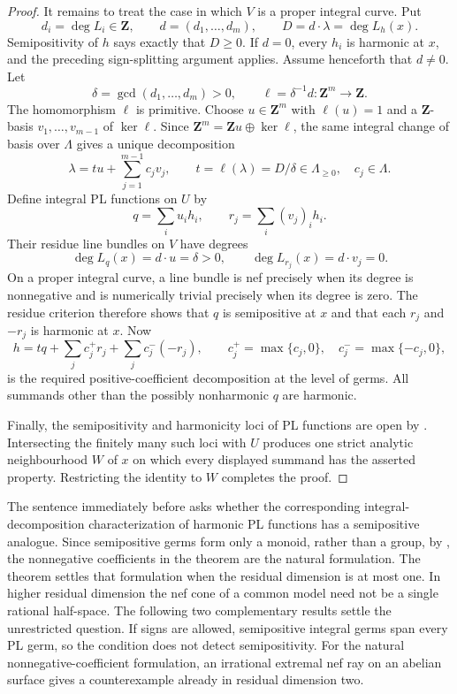 \begin{proof}
It remains to treat the case in which $V$ is a proper integral curve.  Put
\[
                 d_i=\deg L_i\in\mathbf Z,\qquad
                 d=(d_1,\ldots,d_m),\qquad
                 D=d\cdot\lambda=\deg L_h(x).
\]
Semipositivity of $h$ says exactly that $D\geq0$.  If $d=0$, every $h_i$
is harmonic at $x$, and the preceding sign-splitting argument applies.
Assume henceforth that $d\ne0$.  Let
\[
                 \delta=\gcd(d_1,\ldots,d_m)>0,
                 \qquad \ell=\delta^{-1}d:\mathbf Z^m\to\mathbf Z.
\]
The homomorphism $\ell$ is primitive.  Choose $u\in\mathbf Z^m$ with
$\ell(u)=1$ and a $\mathbf Z$-basis
$v_1,\ldots,v_{m-1}$ of $\ker\ell$.  Since
$\mathbf Z^m=\mathbf Zu\oplus\ker\ell$, the same integral change of basis
over $\Lambda$ gives a unique decomposition
\[
            \lambda=t u+\sum_{j=1}^{m-1}c_jv_j,
            \qquad
            t=\ell(\lambda)=D/\delta\in\Lambda_{\geq0},
            \quad c_j\in\Lambda.
\]
Define integral PL functions on $U$ by
\[
                    q=\sum_i u_i h_i,
             \qquad r_j=\sum_i(v_j)_i h_i.
\]
Their residue line bundles on $V$ have degrees
\[
              \deg L_q(x)=d\cdot u=\delta>0,
              \qquad \deg L_{r_j}(x)=d\cdot v_j=0.
\]
On a proper integral curve, a line bundle is nef precisely when its degree
is nonnegative and is numerically trivial precisely when its degree is zero.
The residue criterion \cite[Proposition~7.1]{GJR26} therefore shows that
$q$ is semipositive at $x$ and that each $r_j$ and $-r_j$ is harmonic at
$x$.  Now
\[
 h=tq+\sum_j c_j^+r_j+\sum_j c_j^-(-r_j),
 \qquad
 c_j^+=\max\{c_j,0\},\quad c_j^-=\max\{-c_j,0\},
\]
is the required positive-coefficient decomposition at the level of germs.
All summands other than the possibly nonharmonic $q$ are harmonic.

Finally, the semipositivity and harmonicity loci of PL functions are open
by \cite[Remark~7.3(4)]{GJR26}.  Intersecting the finitely many such loci
with $U$ produces one strict analytic neighbourhood $W$ of $x$ on which
every displayed summand has the asserted property.  Restricting the identity
to $W$ completes the proof.
\end{proof}

The sentence immediately before \cite[Proposition~7.5]{GJR26} asks whether
the corresponding integral-decomposition characterization of harmonic PL
functions has a semipositive analogue.  Since semipositive germs form only a
monoid, rather than a group, by \cite[Remark~7.3(5)]{GJR26}, the nonnegative
coefficients in the theorem are the natural formulation.  The theorem
settles that formulation when the residual dimension is at most one.  In
higher residual dimension the nef cone of a common model need not be a
single rational half-space.  The following two complementary results settle
the unrestricted question.  If signs are allowed, semipositive integral
germs span every PL germ, so the condition does not detect semipositivity.
For the natural nonnegative-coefficient formulation, an irrational extremal
nef ray on an abelian surface gives a counterexample already in residual
dimension two.

